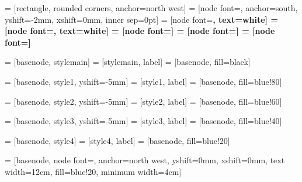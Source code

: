 
 = [rectangle, rounded corners, anchor=north west]
 = [node font=\small, anchor=south, yshift=-2mm, xshift=0mm, inner sep=0pt]
 = [node font=\Huge\bfseries, text=white]
 = [node font=\huge\bfseries, text=white]
 = [node font=\Large\bfseries]
 = [node font=\large\bfseries]
 = [node font=\normalsize\bfseries]

 = [basenode, stylemain]
 = [stylemain, label]
 = [basenode, fill=black]

 = [basenode, style1, yshift=-5mm]
 = [style1, label]
 = [basenode, fill=blue!80]

 = [basenode, style2, yshift=-5mm]
 = [style2, label]
 = [basenode, fill=blue!60]

 = [basenode, style3, yshift=-5mm]
 = [style3, label]
 = [basenode, fill=blue!40]

 = [basenode, style4]
 = [style4, label]
 = [basenode, fill=blue!20]

 = [basenode, node font=\tiny, anchor=north west, yshift=0mm, xshift=0mm, text width=12cm, fill=blue!20, minimum width=4cm]

